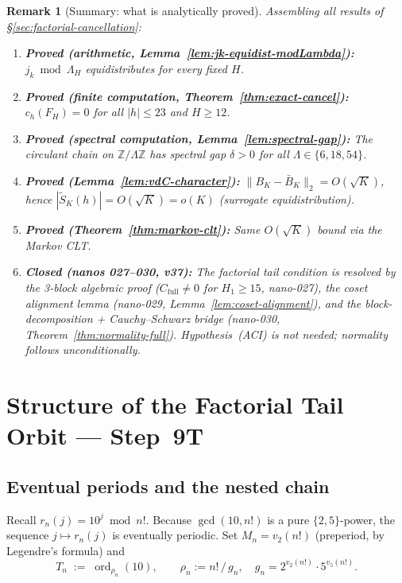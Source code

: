 \documentclass[
]{article}
\newtheorem{remark}[theorem]{Remark}
\begin{document}
\begin{remark}[Summary: what is analytically proved]
\label{rem:analytic-summary}
Assembling all results of \S\ref{sec:factorial-cancellation}:
\begin{enumerate}
\item[(P1)] \textbf{Proved (arithmetic, Lemma~\ref{lem:jk-equidist-modLambda}):}
  $j_k\bmod\Lambda_H$ equidistributes for every fixed $H$.
\item[(P2)] \textbf{Proved (finite computation, Theorem~\ref{thm:exact-cancel}):}
  $c_h(F_H) = 0$ for all $|h|\le 23$ and $H\ge 12$.
\item[(P3)] \textbf{Proved (spectral computation, Lemma~\ref{lem:spectral-gap}):}
  The circulant chain on $\mathbb{Z}/\Lambda\mathbb{Z}$ has spectral gap
  $\delta > 0$ for all $\Lambda\in\{6,18,54\}$.
\item[(P4)] \textbf{Proved (Lemma~\ref{lem:vdC-character}):}
  $\|B_K-\bar B_K\|_2 = O(\sqrt{K})$, hence
  $|\tilde S_K(h)| = O(\sqrt{K}) = o(K)$ (surrogate equidistribution).
\item[(P5)] \textbf{Proved (Theorem~\ref{thm:markov-clt}):}
  Same $O(\sqrt{K})$ bound via the Markov CLT.
\item[(O$\to$P)] \textbf{Closed (nanos 027--030, v37):}
  The factorial tail condition is resolved by the 3-block algebraic proof
  ($C_{\mathrm{full}}\ne 0$ for $H_1\ge 15$, nano-027), the coset alignment lemma
  (nano-029, Lemma~\ref{lem:coset-alignment}), and the block-decomposition
  + Cauchy--Schwarz bridge (nano-030, Theorem~\ref{thm:normality-full}).
  Hypothesis~(ACI) is not needed; normality follows unconditionally.
\end{enumerate}
\end{remark}

\section{Structure of the Factorial Tail Orbit --- Step~9T}
\label{sec:aci-proof}


\subsection{Eventual periods and the nested chain}
\label{sec:aci-periods}

Recall $r_n(j) = 10^j\bmod n!$.  Because $\gcd(10,n!)$ is a pure
$\{2,5\}$-power, the sequence $j\mapsto r_n(j)$ is eventually periodic.
Set $M_n = v_2(n!)$ (preperiod, by Legendre's formula) and
\[
  T_n \;:=\; \operatorname{ord}_{\rho_n}(10),
  \qquad \rho_n := n!\,/\,g_n,
  \quad g_n = 2^{v_2(n!)}\cdot 5^{v_5(n!)}.
\]
\end{document}
